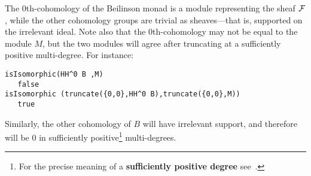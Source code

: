 \documentclass[twoside,12pt, leqno]{amsart}
\begin{document}
The 0th-cohomology of the Beilinson monad is a module representing the sheaf ${\mathcal F}$,
while the other cohomology groups are trivial as sheaves---that is, supported on the irrelevant ideal. 
Note also that the 0th-cohomology may not be equal to the module $M$, but the two modules
will agree after  truncating at a sufficiently positive multi-degree.
For instance:
{\small
\begin{verbatim}
isIsomorphic(HH^0 B ,M)
   false
isIsomorphic (truncate({0,0},HH^0 B),truncate({0,0},M))
   true
\end{verbatim}}
\noindent Similarly, the other cohomology of $B$ will have irrelevant support, and therefore will be 0 in sufficiently positive\footnote{For the precise meaning of a {\bf sufficiently positive degree} see~\cite[Definition~1.8]{EES}.} multi-degrees.
\end{document}
